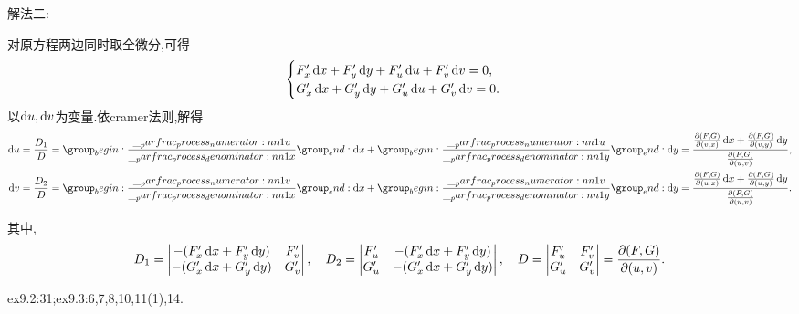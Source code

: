\begin{solution}
    解法二:

    对原方程两边同时取全微分,可得
    $$
    \begin{cases}
        F_x' \dif x + F_y' \dif y + F_u' \dif u + F_v' \dif v = 0,\\
        G_x' \dif x + G_y' \dif y + G_u' \dif u + G_v' \dif v = 0.
    \end{cases}
    $$
    以$\operatorname{d\!} u, \operatorname{d\!} v$为变量.依cramer法则,解得
    \begin{align*}
        \dif u = \frac{D_1}{D} = \parfrac{u}{x} \dif x + \parfrac{u}{y} \dif y = \frac{\frac{\partial (F,G)}{\partial (v,x)}\dif x + \frac{\partial (F,G)}{\partial (v,y)} \dif y}{\frac{\partial (F,G)}{\partial (u,v)}},\\
        \dif v = \frac{D_2}{D} = \parfrac{v}{x} \dif x + \parfrac{v}{y} \dif y = \frac{\frac{\partial (F,G)}{\partial (u,x)}\dif x + \frac{\partial (F,G)}{\partial (u,y)} \dif y}{\frac{\partial (F,G)}{\partial (u,v)}}.
    \end{align*}

    其中,$$D_1 = \begin{vmatrix}
        -(F_x' \dif x + F_y' \dif y) & F_v' \\
        -(G_x' \dif x + G_y' \dif y) & G_v'
    \end{vmatrix}, \quad D_2 = \begin{vmatrix}
        F_u' & -(F_x' \dif x + F_y' \dif y)\\
        G_u' & -(G_x' \dif x + G_y' \dif y)
    \end{vmatrix},\quad D = \begin{vmatrix}
        F_u' & F_v'\\
        G_u' & G_v'
    \end{vmatrix}= \frac{\partial (F,G)}{\partial (u,v)}.$$

\end{solution}

\begin{homework}
    ex9.2:31;ex9.3:6,7,8,10,11(1),14.
\end{homework}



